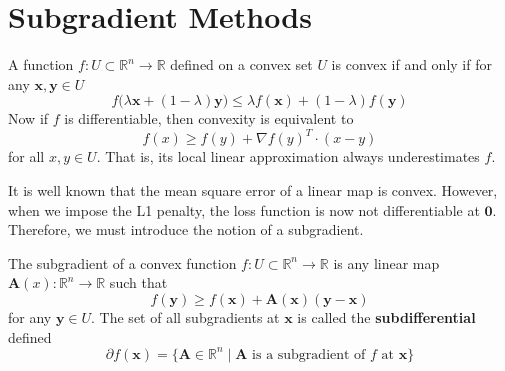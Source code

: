 \section{Subgradient Methods}

  \begin{definition}
    A function $f: U \subset \mathbb{R}^n \rightarrow \mathbb{R}$ defined on a convex set $U$ is convex if and only if for any $\mathbf{x}, \mathbf{y} \in U$
    \begin{equation}
      f \big(\lambda \mathbf{x} + (1 - \lambda) \mathbf{y} \big) \leq \lambda f(\mathbf{x}) + (1 - \lambda) f(\mathbf{y})
    \end{equation}
    Now if $f$ is differentiable, then convexity is equivalent to 
    \begin{equation}
      f(x) \geq f(y) + \nabla f(y)^T \cdot (x - y)
    \end{equation}
    for all $x, y \in U$. That is, its local linear approximation always underestimates $f$. 
  \end{definition}

  It is well known that the mean square error of a linear map is convex. However, when we impose the L1 penalty, the loss function is now not differentiable at $\mathbf{0}$. Therefore, we must introduce the notion of a subgradient. 

  \begin{definition}[Subgradient]
    The subgradient of a convex function $f: U \subset \mathbb{R}^n \rightarrow \mathbb{R}$ is any linear map $\mathbf{A} (x): \mathbb{R}^n \rightarrow \mathbb{R}$ such that 
    \begin{equation}
      f(\mathbf{y}) \geq f(\mathbf{x}) + \mathbf{A}(\mathbf{x}) (\mathbf{y} - \mathbf{x})
    \end{equation}
    for any $\mathbf{y} \in U$. The set of all subgradients at $\mathbf{x}$ is called the \textbf{subdifferential} defined 
    \begin{equation}
      \partial f (\mathbf{x}) = \{ \mathbf{A} \in \mathbb{R}^n \mid \mathbf{A} \text{ is a subgradient of } f \text{ at } \mathbf{x} \}
    \end{equation}
  \end{definition}

